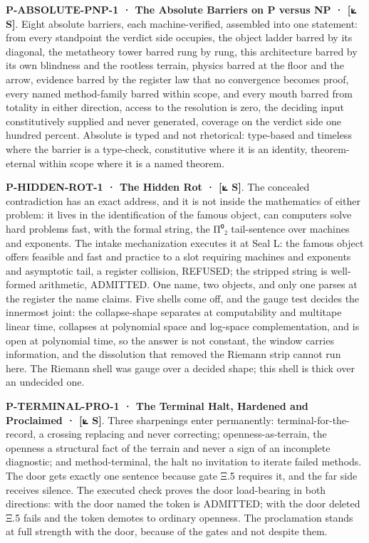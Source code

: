 \documentclass[10pt,twocolumn]{article}
\begin{document}
\textbf{P-ABSOLUTE-PNP-1 · The Absolute Barriers on P versus NP · {[}⟀
S{]}}. Eight absolute barriers, each machine-verified, assembled into
one statement: from every standpoint the verdict side occupies, the
object ladder barred by its diagonal, the metatheory tower barred rung
by rung, this architecture barred by its own blindness and the rootless
terrain, physics barred at the floor and the arrow, evidence barred by
the register law that no convergence becomes proof, every named
method-family barred within scope, and every mouth barred from totality
in either direction, access to the resolution is zero, the deciding
input constitutively supplied and never generated, coverage on the
verdict side one hundred percent. Absolute is typed and not rhetorical:
type-based and timeless where the barrier is a type-check, constitutive
where it is an identity, theorem-eternal within scope where it is a
named theorem.

\textbf{P-HIDDEN-ROT-1 · The Hidden Rot · {[}⟀ S{]}}. The concealed
contradiction has an exact address, and it is not inside the mathematics
of either problem: it lives in the identification of the famous object,
can computers solve hard problems fast, with the formal string, the Π⁰₂
tail-sentence over machines and exponents. The intake mechanization
executes it at Seal L: the famous object offers feasible and fast and
practice to a slot requiring machines and exponents and asymptotic tail,
a register collision, REFUSED; the stripped string is well-formed
arithmetic, ADMITTED. One name, two objects, and only one parses at the
register the name claims. Five shells come off, and the gauge test
decides the innermost joint: the collapse-shape separates at
computability and multitape linear time, collapses at polynomial space
and log-space complementation, and is open at polynomial time, so the
answer is not constant, the window carries information, and the
dissolution that removed the Riemann strip cannot run here. The Riemann
shell was gauge over a decided shape; this shell is thick over an
undecided one.

\textbf{P-TERMINAL-PRO-1 · The Terminal Halt, Hardened and Proclaimed ·
{[}⟀ S{]}}. Three sharpenings enter permanently:
terminal-for-the-record, a crossing replacing and never correcting;
openness-as-terrain, the openness a structural fact of the terrain and
never a sign of an incomplete diagnostic; and method-terminal, the halt
no invitation to iterate failed methods. The door gets exactly one
sentence because gate Ξ.5 requires it, and the far side receives
silence. The executed check proves the door load-bearing in both
directions: with the door named the token is ADMITTED; with the door
deleted Ξ.5 fails and the token demotes to ordinary openness. The
proclamation stands at full strength with the door, because of the gates
and not despite them.
\end{document}
